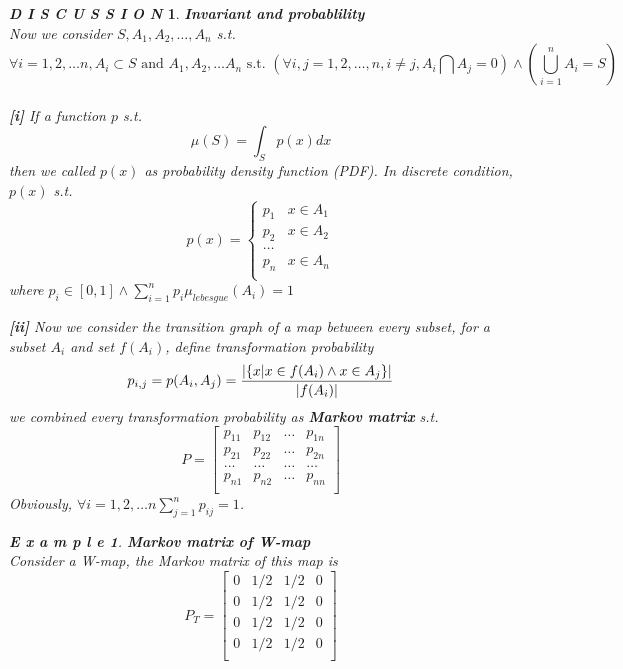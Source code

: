 \documentclass[12pt]{article}
\theoremstyle{plain}
\newtheorem{example}{\textbf{E x a m p l e}}[section]
\newtheorem{discussion}{\textit{D I S C U S S I O N}}[section]
\begin{document}
\begin{discussion}\textbf{Invariant and probablility} 
\\\noindent Now we consider $S, A_1, A_2, \ldots, A_n$ s.t.
$$
\forall i = 1,2, \ldots n, A_i \subset S \text{ and } A_1, A_2, \ldots A_n \text{ s.t. } \left(\forall i, j = 1,2, \ldots, n, i \neq j, A_i \bigcap A_j = 0\right) \land \left(\bigcup_{i = 1}^{n} A_i = S\right)
$$
\\\noindent \textbf{[i]} If a function $p$ s.t.
$$
\mu(S) = \int_{S}p(x) dx
$$
then we called $p(x)$ as probability density function (PDF). In discrete condition, $p(x)$ s.t.
$$
p(x) = \left\{\begin{array}{cc}
p_1 & x \in A_1 \\
p_2 & x \in A_2 \\
\ldots \\
p_n & x \in A_n \\
\end{array}\right.
$$
where $p_i \in [0, 1] \land \sum_{i = 1}^{n}p_i\mu_{lebesgue}(A_i) = 1$

            \textbf{[ii]} Now we consider the transition graph of a map between every subset, for a subset $A_i$ and set $f(A_i)$, define transformation probability
$$
p_{i, j} = p(A_i, A_j) = {|\{x | x \in f(A_i) \land x \in A_j \}| \over |f(A_i)|}
$$
we combined every transformation probability as \textbf{Markov matrix} s.t.
$$
P = \left[\begin{array}{cccc}
p_{11} & p_{12} & \ldots & p_{1n} \\
p_{21} & p_{22} & \ldots & p_{2n} \\
\ldots & \ldots & \ldots & \ldots \\
p_{n1} & p_{n2} & \ldots & p_{nn} \\
\end{array}\right]
$$
Obviously, $\forall i = 1, 2, \ldots n \sum_{j = 1}^{n}p_{ij} = 1$.

\begin{example}\textbf{Markov matrix of W-map}
\\\noindent Consider a W-map, the Markov matrix of this map is
$$
P_T = \left[\begin{array}{cccc}
0 & 1/2 & 1/2 & 0 \\
0 & 1/2 & 1/2 & 0 \\
0 & 1/2 & 1/2 & 0 \\
0 & 1/2 & 1/2 & 0 \\
\end{array}\right]
$$
\end{example}


\end{discussion}
\end{document}
